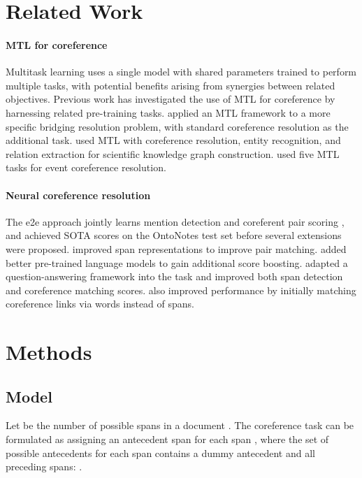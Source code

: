 \documentclass[11pt]{article}
\begin{document}
\section{Related Work} \label{sec:literature}
\paragraph{MTL for coreference}
Multitask learning \cite{Caruana1997,CollobertWeston2008} uses a single model with shared parameters trained to perform multiple tasks, with potential benefits arising from synergies between related objectives.
Previous work has investigated the use of MTL for coreference by harnessing related pre-training tasks. 
\citet{yu-poesio-2020-multitask, kobayashi-etal-2022-constrained} applied an MTL framework to a more specific bridging resolution problem, with standard coreference resolution as the additional task. \citet{luan-etal-2018-multi} used MTL with coreference resolution, entity recognition, and relation extraction for scientific knowledge graph construction. \citet{lu-ng-2021-constrained} used five MTL tasks for event coreference resolution. 


\paragraph{Neural coreference resolution}
The e2e approach jointly learns mention detection and coreferent pair scoring \citep{lee-etal-2017-end}, and achieved SOTA scores on the OntoNotes test set before several extensions were proposed. \citet{lee-etal-2018-higher, kantor-globerson-2019-coreference} improved span representations to improve pair matching. 
\citet{joshi-etal-2020-spanbert} added better pre-trained language models to gain additional score boosting. \citet{wu-etal-2020-corefqa} adapted a question-answering framework into the task and improved both span detection and coreference matching scores. \citet{dobrovolskii-2021-word} also improved performance by initially matching coreference links via words instead of spans.

\section{Methods} \label{sec:model}
\subsection{Model}
Let  be the number of possible spans in a document . The coreference task can be formulated as assigning an antecedent span  for each span , where the set of possible antecedents for each span  contains a dummy antecedent  and all preceding spans: . 
\end{document}
